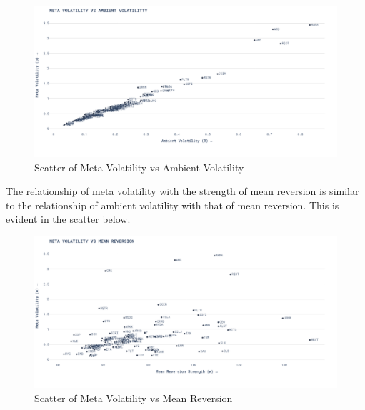 \begin{figure}[H]
    \centering
    \includegraphics[width=\textwidth]{images/meta_volatility_vs_ambient_volatility.png}
    \caption{Scatter of Meta Volatility vs Ambient Volatility}
    \label{fig:figure_label}
\end{figure}

The relationship of meta volatility with the strength of mean reversion is similar to the relationship of ambient volatility with that of mean reversion. This is evident in the scatter below.

\begin{figure}[H]
    \centering
    \includegraphics[width=\textwidth]{images/meta_volatility_vs_mean_reversion.png}
    \caption{Scatter of Meta Volatility vs Mean Reversion}
    \label{fig:figure_label}
\end{figure}
